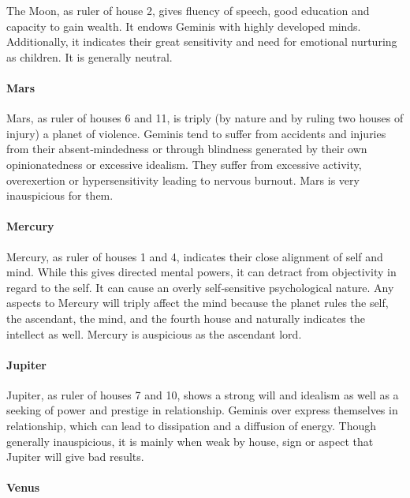 The Moon, as ruler of house 2, gives fluency of speech, good education and capacity to gain wealth. It endows Geminis with highly developed minds. Additionally, it indicates their great sensitivity and need for emotional nurturing as children. It is generally neutral.

 

\paragraph{Mars}

Mars, as ruler of houses 6 and 11, is triply (by nature and by ruling two houses of injury) a planet of violence. Geminis tend to suffer from accidents and injuries from their absent‑mindedness or through blindness generated by their own opinionatedness or excessive idealism. They suffer from excessive activity, overexertion or hypersensitivity leading to nervous burnout. Mars is very inauspicious for them.

 

\paragraph{Mercury}

Mercury, as ruler of houses 1 and 4, indicates their close alignment of self and mind. While this gives directed mental powers, it can detract from objectivity in regard to the self. It can cause an overly self‑sensitive psychological nature. Any aspects to Mercury will triply affect the mind because the planet rules the self, the ascendant, the mind, and the fourth house and naturally indicates the intellect as well. Mercury is auspicious as the ascendant lord.

 

\paragraph{Jupiter}

Jupiter, as ruler of houses 7 and 10, shows a strong will and idealism as well as a seeking of power and prestige in relationship. Geminis over express themselves in relationship, which can lead to dissipation and a diffusion of energy. Though generally inauspicious, it is mainly when weak by house, sign or aspect that Jupiter will give bad results.

 

\paragraph{Venus}

